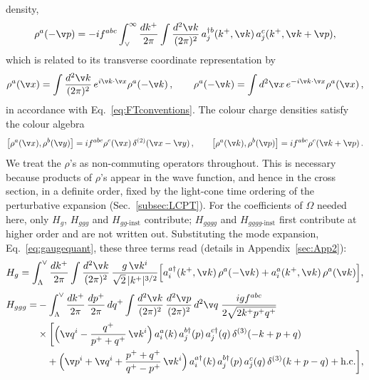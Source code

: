 density,
\begin{align}\label{eq:rho}
\rho^{a}(-\v p)=-i f^{abc}\int_{\vee}^{\infty}\frac{dk^{+}}{2\pi}\int\frac{d^{2}\v k}{(2\pi)^{2}}\,
a_{j}^{\dagger b}(k^{+},\v k)\,a_{j}^{c}(k^{+},\v k+\v p),
\end{align}
which is related to its transverse coordinate representation by
\begin{align}\label{eq:rhoFT}
\rho^{a}(\v x)=\int\frac{d^{2}\v k}{(2\pi)^{2}}\,e^{i\v k\cdot\v x}\rho^{a}(-\v k)\,,\qquad
\rho^{a}(-\v k)=\int d^{2}\v x\,e^{-i\v k\cdot\v x}\rho^{a}(\v x)\,,
\end{align}
in accordance with Eq.~\eqref{eq:FTconventions}. The colour charge densities satisfy the colour algebra
\begin{align}\label{eq:rhoalgebra}
\big[\rho^{a}(\v x),\rho^{b}(\v y)\big]=i f^{abc}\rho^{c}(\v x)\,\delta^{(2)}(\v x-\v y)\,,\qquad
\big[\rho^{a}(\v k),\rho^{b}(\v p)\big]=i f^{abc}\rho^{c}(\v k+\v p)\,.
\end{align}
We treat the $\rho$'s as non-commuting operators throughout. This is necessary because products of
$\rho$'s appear in the wave function, and hence in the cross section, in a definite order, fixed by
the light-cone time ordering of the perturbative expansion (Sec.~\ref{subsec:LCPT}).
For the coefficients of $\Omega$ needed here, only $H_{g}$, $H_{ggg}$ and $H_{gg\text{-inst}}$
contribute; $H_{gggg}$ and $H_{gggg\text{-inst}}$ first contribute at higher order and are not written
out. Substituting the mode expansion, Eq.~\eqref{eq:gaugequant}, these three terms read (details in
Appendix~\ref{sec:App2}):
\begin{align}\label{eq:Hg}
H_{g}=\int_{\Lambda}^{\vee}\frac{dk^{+}}{2\pi}\int\frac{d^{2}\v k}{(2\pi)^{2}}\,
\frac{g\,\v k^{i}}{\sqrt{2}\,|k^{+}|^{3/2}}\Big[a_{i}^{a\dagger}(k^{+},\v k)\,\rho^{a}(-\v k)
+a_{i}^{a}(k^{+},\v k)\,\rho^{a}(\v k)\Big],
\end{align}
\begin{align}\label{eq:Hggg}
H_{ggg}=&-\int_{\Lambda}^{\vee}\frac{dk^{+}}{2\pi}\,\frac{dp^{+}}{2\pi}\,dq^{+}\int\frac{d^{2}\v k}{(2\pi)^{2}}\,
\frac{d^{2}\v p}{(2\pi)^{2}}\,d^{2}\v q\;\frac{i g f^{abc}}{2\sqrt{2k^{+}p^{+}q^{+}}}\notag\\
&\times\bigg[\Big(\v q^{i}-\frac{q^{+}}{p^{+}+q^{+}}\,\v k^{i}\Big)\,a_{i}^{a}(k)\,a_{j}^{b\dagger}(p)\,a_{j}^{c\dagger}(q)\,\delta^{(3)}(-k+p+q)\notag\\
&\quad+\Big(\v p^{i}+\v q^{i}+\frac{p^{+}+q^{+}}{q^{+}-p^{+}}\,\v k^{i}\Big)\,a_{i}^{a\dagger}(k)\,a_{j}^{b\dagger}(p)\,a_{j}^{c}(q)\,\delta^{(3)}(k+p-q)+{\rm h.c.}\bigg],
\end{align}
